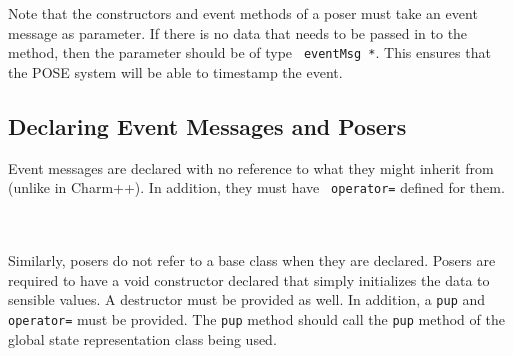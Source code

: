 \documentclass[10pt]{article}
\begin{document}
~\\
\\

Note that the constructors and event methods of a poser must take an
event message as parameter.  If there is no data that needs to be
passed in to the method, then the parameter should be of type {\tt
eventMsg *}.  This ensures that the POSE system will be able to
timestamp the event.

\subsection{Declaring Event Messages and Posers}

Event messages are declared with no reference to what they might
inherit from (unlike in Charm++).  In addition, they must have {\tt
operator=} defined for them.

~\\
\\

Similarly, posers do not refer to a base class when they are
declared.  Posers are required to have a void constructor declared
that simply initializes the data to sensible values.  A destructor
must be provided as well.  In addition, a {\tt pup} and {\tt
operator=} must be provided.  The {\tt pup} method should call the
{\tt pup} method of the global state representation class being used.
\end{document}
